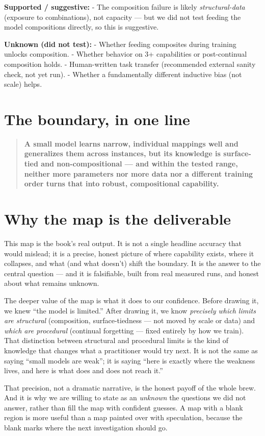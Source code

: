 \textbf{Supported / suggestive:} - The composition failure is likely
\emph{structural-data} (exposure to combinations), not capacity --- but
we did not test feeding the model compositions directly, so this is
suggestive.

\textbf{Unknown (did not test):} - Whether feeding composites during
training unlocks composition. - Whether behavior on 3+ capabilities or
post-continual composition holds. - Human-written task transfer
(recommended external sanity check, not yet run). - Whether a
fundamentally different inductive bias (not scale) helps.

\section{The boundary, in one line}\label{the-boundary-in-one-line}

\begin{quote}
\textbf{A small model learns narrow, individual mappings well and
generalizes them across instances, but its knowledge is surface-tied and
non-compositional --- and within the tested range, neither more
parameters nor more data nor a different training order turns that into
robust, compositional capability.}
\end{quote}

\section{Why the map is the
deliverable}\label{why-the-map-is-the-deliverable}

This map is the book's real output. It is not a single headline accuracy
that would mislead; it is a precise, honest picture of where capability
exists, where it collapses, and what (and what doesn't) shift the
boundary. It is the answer to the central question --- and it is
falsifiable, built from real measured runs, and honest about what
remains unknown.

The deeper value of the map is what it does to our confidence. Before
drawing it, we knew ``the model is limited.'' After drawing it, we know
\emph{precisely which limits are structural} (composition,
surface-tiedness --- not moved by scale or data) and \emph{which are
procedural} (continual forgetting --- fixed entirely by how we train).
That distinction between structural and procedural limits is the kind of
knowledge that changes what a practitioner would try next. It is not the
same as saying ``small models are weak''; it is saying ``here is exactly
where the weakness lives, and here is what does and does not reach it.''

That precision, not a dramatic narrative, is the honest payoff of the
whole brew. And it is why we are willing to state as an \emph{unknown}
the questions we did not answer, rather than fill the map with confident
guesses. A map with a blank region is more useful than a map painted
over with speculation, because the blank marks where the next
investigation should go.
